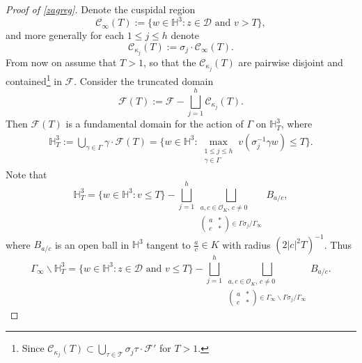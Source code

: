 \documentclass[12pt,reqno]{amsart}
\numberwithin{equation}{section}
\renewcommand{\pmatrix}[4]{\left(\begin{smallmatrix}#1 & #2 \\ #3 & #4\end{smallmatrix}\right)}
\begin{document}
\begin{proof}[Proof of \cref{zagreg}]
Denote the cuspidal region
\begin{equation} \label{Sinftydef}
    \mathcal{C}_{\infty}(T):= \big\{w \in \mathbb{H}^3: z \in \mathcal{D} \text{ and } v>T \big\},
\end{equation}
and more generally for each $1 \leq j \leq h$ denote
\begin{equation} \label{Skappajdef}
    \mathcal{C}_{\kappa_j}(T):=\sigma_{j} \cdot  \mathcal{C}_{\infty}(T).
\end{equation}
From now on assume that $T > 1$, so that the $\mathcal{C}_{\kappa_j}(T)$ are pairwise disjoint and contained\footnote{Since $\displaystyle\mathcal{C}_{\kappa_j}(T) \subset \bigcup_{\tau\in \mathcal{T}} \sigma_j \tau \cdot \mathcal{F}'$ for $T > 1$.} in $\mathcal{F}$. Consider the truncated domain 
\begin{equation} \label{DTdef}
    \mathcal{F}(T) := \mathcal{F}-\bigsqcup_{j=1}^{h} \mathcal{C}_{\kappa_j}(T).
\end{equation}
Then $\mathcal{F}(T)$ is a fundamental domain for the action of $\Gamma$ on $\mathbb{H}^3_T$, where
\begin{align*}
    \mathbb{H}_{T}^3 := \bigcup_{\gamma \in \Gamma} \gamma \cdot \mathcal{F}(T) = \Big\{w \in \mathbb{H}^3: \max_{\substack{1 \leq j \leq h \\ \gamma \in \Gamma}} v(\sigma_{j}^{-1} \gamma w ) \leq T \Big\}.
\end{align*}
Note that
\begin{equation*}
    \mathbb{H}_T^3 = \big\{w \in \mathbb{H}^3: v \leq T \big\} - \bigsqcup_{j=1}^h \bigsqcup_{\substack{a, c \in \mathcal{O}_{K},\, c \neq 0 \\ \pmatrix {a} {*} {c} {*} \in \Gamma \sigma_{j} / \Gamma_{\infty}  }} B_{a/c}, 
\end{equation*}
where $B_{a/c}$ is an open ball in $\mathbb{H}^3$ tangent to $\frac{a}{c} \in K$ with radius $(2 |c|^2 T)^{-1}$. Thus 
\begin{equation} \label{truncateident}
    \Gamma_{\infty} \backslash \mathbb{H}_T^3 = \big\{w \in \mathbb{H}^3: z \in \mathcal{D} \text{ and } v \leq T \big\}
    - \bigsqcup_{j=1}^h \bigsqcup_{\substack{a,c \in \mathcal{O}_{K}, \, c \neq 0 \\ \pmatrix {a} {*} {c} {*} \in \Gamma_{\infty} \backslash \Gamma \sigma_{j} /\Gamma_{\infty}  }} B_{a/c}. 
\end{equation}


\end{proof}
\end{document}
